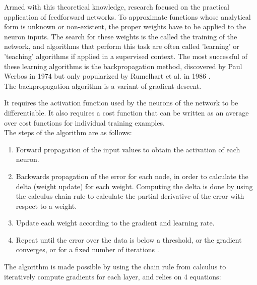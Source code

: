 \documentclass[12pt,oneside]{CUNY_CS_PhD}
\begin{document}
Armed with this theoretical knowledge, research focused on the practical application of feedforward networks. To approximate functions whose analytical form is unknown or non-existent, the proper weights have to be applied to the neuron inputs. The search for these weights is the called the training of the network, and algorithms that perform this task are often called 'learning' or 'teaching' algorithms if applied in a supervised context. The most successful of these learning algorithms is the backpropagation method, discovered by Paul Werbos in 1974 \cite{werbos_beyond_1974} but only popularized by Rumelhart et al. in 1986 \cite{rumelhart1986learning}.\\
The backpropagation algorithm is a variant of gradient-descent.

It requires the activation function used by the neurons of the network to be differentiable. It also requires a cost function that can be written as an average over cost functions for individual training examples.\\
The steps of the algorithm are as follows:
\begin{enumerate}
\item Forward propagation of the input values to obtain the activation of each neuron.
\item Backwards propagation of the error for each node, in order to calculate the delta (weight update) for each weight. Computing the delta is done by using the calculus chain rule to calculate the partial derivative of the error with respect to a  weight.
\item Update each weight according to the gradient and learning rate. 

\item Repeat until the error over the data is below a threshold, or the gradient converges, or for a fixed number of iterations .

\end{enumerate}
The algorithm is made possible by using the chain rule from calculus to iteratively compute gradients for each layer, and relies on 4 equations:
\end{document}

